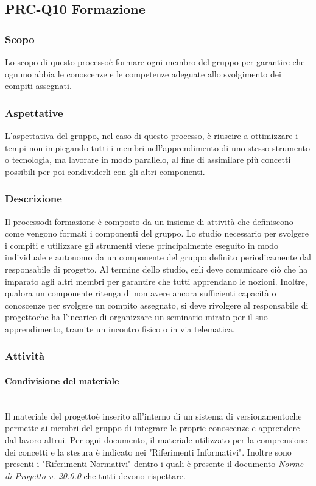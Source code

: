 	\subsection{PRC-Q10 Formazione}
		\subsubsection{Scopo}
			Lo scopo di questo processo\glosp è formare ogni membro del gruppo per garantire che ognuno abbia le conoscenze e le competenze adeguate allo svolgimento dei compiti assegnati.
		\subsubsection{Aspettative}
			L'aspettativa del gruppo, nel caso di questo processo\glo, è riuscire a ottimizzare i tempi non impiegando tutti i membri nell'apprendimento di uno stesso strumento o tecnologia, ma lavorare in modo parallelo, al fine di assimilare più concetti possibili per poi condividerli con gli altri componenti.
		\subsubsection{Descrizione}
			Il processo\glosp di formazione è composto da un insieme di attività che definiscono come vengono formati i componenti del gruppo.
			Lo studio necessario per svolgere i compiti e utilizzare gli strumenti viene principalmente eseguito in modo individuale e autonomo da un componente del gruppo definito periodicamente dal responsabile di progetto\glo. Al termine dello studio, egli deve comunicare ciò che ha imparato agli altri membri per garantire che tutti apprendano le nozioni.
			Inoltre, qualora un componente ritenga di non avere ancora sufficienti capacità o conoscenze per svolgere un compito assegnato, si deve rivolgere al responsabile di progetto\glosp che ha l'incarico di organizzare un seminario mirato per il suo apprendimento, tramite un incontro fisico o in via telematica.
		\subsubsection{Attività}
			\paragraph{Condivisione del materiale}\mbox{}\\ [1mm]
				Il materiale del progetto\glosp è inserito all'interno di un sistema di versionamento\glosp che permette ai membri del gruppo di integrare le proprie conoscenze e apprendere dal lavoro altrui.
				Per ogni documento, il materiale utilizzato per la comprensione dei concetti e la stesura è indicato nei "Riferimenti Informativi".
				Inoltre sono presenti i "Riferimenti Normativi" dentro i quali è presente il documento \textit{Norme di Progetto v. 20.0.0} che tutti devono rispettare.
